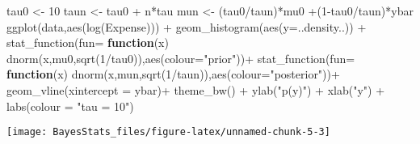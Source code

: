 \documentclass[
]{book}
\newenvironment{Shaded}{\begin{snugshade}}{\end{snugshade}}
\newcommand{\AttributeTok}[1]{\textcolor[rgb]{0.77,0.63,0.00}{#1}}
\newcommand{\ControlFlowTok}[1]{\textcolor[rgb]{0.13,0.29,0.53}{\textbf{#1}}}
\newcommand{\DecValTok}[1]{\textcolor[rgb]{0.00,0.00,0.81}{#1}}
\newcommand{\FunctionTok}[1]{\textcolor[rgb]{0.00,0.00,0.00}{#1}}
\newcommand{\NormalTok}[1]{#1}
\newcommand{\OtherTok}[1]{\textcolor[rgb]{0.56,0.35,0.01}{#1}}
\newcommand{\SpecialCharTok}[1]{\textcolor[rgb]{0.00,0.00,0.00}{#1}}
\newcommand{\StringTok}[1]{\textcolor[rgb]{0.31,0.60,0.02}{#1}}
\begin{document}
\begin{Shaded}
\begin{Highlighting}[]
\NormalTok{tau0 }\OtherTok{\textless{}{-}} \DecValTok{10}
\NormalTok{taun }\OtherTok{\textless{}{-}}\NormalTok{ tau0 }\SpecialCharTok{+}\NormalTok{ n}\SpecialCharTok{*}\NormalTok{tau}
\NormalTok{mun }\OtherTok{\textless{}{-}}\NormalTok{ (tau0}\SpecialCharTok{/}\NormalTok{taun)}\SpecialCharTok{*}\NormalTok{mu0 }\SpecialCharTok{+}\NormalTok{(}\DecValTok{1}\SpecialCharTok{{-}}\NormalTok{tau0}\SpecialCharTok{/}\NormalTok{taun)}\SpecialCharTok{*}\NormalTok{ybar}
\FunctionTok{ggplot}\NormalTok{(data,}\FunctionTok{aes}\NormalTok{(}\FunctionTok{log}\NormalTok{(Expense))) }\SpecialCharTok{+}
  \FunctionTok{geom\_histogram}\NormalTok{(}\FunctionTok{aes}\NormalTok{(}\AttributeTok{y=}\NormalTok{..density..)) }\SpecialCharTok{+}
  \FunctionTok{stat\_function}\NormalTok{(}\AttributeTok{fun=} \ControlFlowTok{function}\NormalTok{(x) }\FunctionTok{dnorm}\NormalTok{(x,mu0,}\FunctionTok{sqrt}\NormalTok{(}\DecValTok{1}\SpecialCharTok{/}\NormalTok{tau0)),}\FunctionTok{aes}\NormalTok{(}\AttributeTok{colour=}\StringTok{"prior"}\NormalTok{))}\SpecialCharTok{+}
  \FunctionTok{stat\_function}\NormalTok{(}\AttributeTok{fun=} \ControlFlowTok{function}\NormalTok{(x) }\FunctionTok{dnorm}\NormalTok{(x,mun,}\FunctionTok{sqrt}\NormalTok{(}\DecValTok{1}\SpecialCharTok{/}\NormalTok{taun)),}\FunctionTok{aes}\NormalTok{(}\AttributeTok{colour=}\StringTok{"posterior"}\NormalTok{))}\SpecialCharTok{+}
  \FunctionTok{geom\_vline}\NormalTok{(}\AttributeTok{xintercept =}\NormalTok{ ybar)}\SpecialCharTok{+}
  \FunctionTok{theme\_bw}\NormalTok{() }\SpecialCharTok{+} \FunctionTok{ylab}\NormalTok{(}\StringTok{"p(y)"}\NormalTok{) }\SpecialCharTok{+} \FunctionTok{xlab}\NormalTok{(}\StringTok{"y"}\NormalTok{) }\SpecialCharTok{+} \FunctionTok{labs}\NormalTok{(}\AttributeTok{colour =} \StringTok{"tau = 10"}\NormalTok{)}
\end{Highlighting}
\end{Shaded}

\begin{center}\texttt{[image: BayesStats\_files/figure-latex/unnamed-chunk-5-3]} \end{center}
\end{document}
